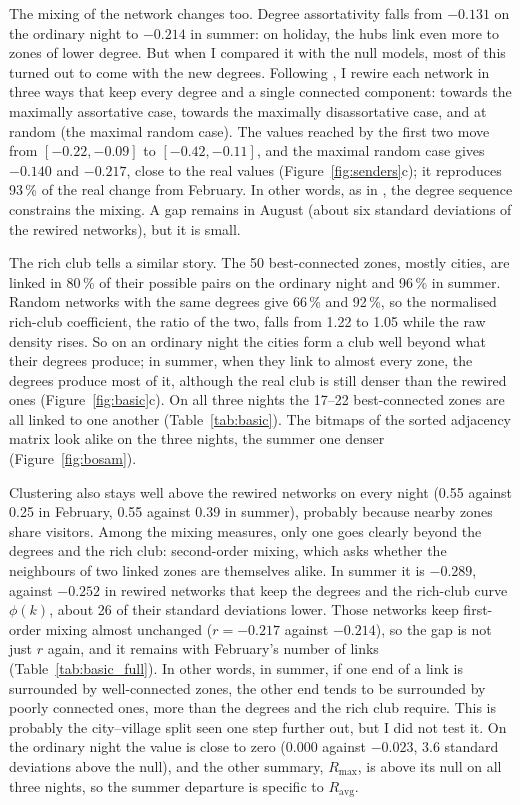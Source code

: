 The mixing of the network changes too. Degree assortativity falls from $-0.131$ on the ordinary night to $-0.214$ in summer: on holiday, the hubs link even more to zones of lower degree. But when I compared it with the null models, most of this turned out to come with the new degrees. Following \citet{zhou2007structural}, I rewire each network in three ways that keep every degree and a single connected component: towards the maximally assortative case, towards the maximally disassortative case, and at random (the maximal random case). The values reached by the first two move from $[-0.22,-0.09]$ to $[-0.42,-0.11]$, and the maximal random case gives $-0.140$ and $-0.217$, close to the real values (Figure~\ref{fig:senders}c); it reproduces 93\,\% of the real change from February. In other words, as in \citet{zhou2007structural}, the degree sequence constrains the mixing. A gap remains in August (about six standard deviations of the rewired networks), but it is small.

The rich club tells a similar story. The 50 best-connected zones, mostly cities, are linked in 80\,\% of their possible pairs on the ordinary night and 96\,\% in summer. Random networks with the same degrees give 66\,\% and 92\,\%, so the normalised rich-club coefficient, the ratio of the two, falls from 1.22 to 1.05 while the raw density rises. So on an ordinary night the cities form a club well beyond what their degrees produce; in summer, when they link to almost every zone, the degrees produce most of it, although the real club is still denser than the rewired ones (Figure~\ref{fig:basic}c). On all three nights the 17--22 best-connected zones are all linked to one another (Table~\ref{tab:basic}). The bitmaps of the sorted adjacency matrix look alike on the three nights, the summer one denser (Figure~\ref{fig:bosam}).

Clustering also stays well above the rewired networks on every night (0.55 against 0.25 in February, 0.55 against 0.39 in summer), probably because nearby zones share visitors. Among the mixing measures, only one goes clearly beyond the degrees and the rich club: second-order mixing, which asks whether the neighbours of two linked zones are themselves alike. In summer it is $-0.289$, against $-0.252$ in rewired networks that keep the degrees and the rich-club curve $\phi(k)$, about 26 of their standard deviations lower. Those networks keep first-order mixing almost unchanged ($r=-0.217$ against $-0.214$), so the gap is not just $r$ again, and it remains with February's number of links (Table~\ref{tab:basic_full}). In other words, in summer, if one end of a link is surrounded by well-connected zones, the other end tends to be surrounded by poorly connected ones, more than the degrees and the rich club require. This is probably the city--village split seen one step further out, but I did not test it. On the ordinary night the value is close to zero ($0.000$ against $-0.023$, 3.6 standard deviations above the null), and the other summary, $R_{\max}$, is above its null on all three nights, so the summer departure is specific to $R_{\mathrm{avg}}$.

